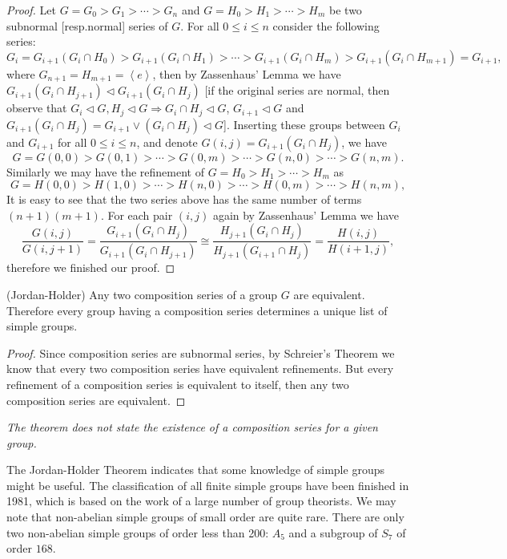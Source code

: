 \begin{proof}
Let $G=G_0>G_1>\cdots >G_n$ and $G=H_0>H_1>\cdots >H_m$ be two subnormal [resp.normal] series of $G$. For all $0\le i\le n$ consider the following series: 
$$
G_i=G_{i+1}\left( G_i\cap H_0 \right) >G_{i+1}\left( G_i\cap H_1 \right) >\cdots >G_{i+1}\left( G_i\cap H_m \right) >G_{i+1}\left( G_i\cap H_{m+1} \right) =G_{i+1},
$$
where $G_{n+1}=H_{m+1}=\left< e \right> $, then by Zassenhaus' Lemma we have $G_{i+1}\left( G_i\cap H_{j+1} \right) \lhd G_{i+1}\left( G_i\cap H_j \right) $ [if the original series are normal, then observe that $G_i\lhd G,H_j\lhd G\Rightarrow G_i\cap H_j\lhd G$, $G_{i+1}\lhd G$ and $G_{i+1}\left( G_i\cap H_j \right) =G_{i+1}\lor \left( G_i\cap H_j \right) \lhd G$]. Inserting these groups between $G_i$ and $G_{i+1}$ for all $0\le i\le n$, and denote $G\left( i,j \right) =G_{i+1}\left( G_i\cap H_j \right) $, we have 
$$
G=G\left( 0,0 \right) >G\left( 0,1 \right) >\cdots >G\left( 0,m \right) >\cdots >G\left( n,0 \right) >\cdots >G\left( n,m \right) .
$$
Similarly we may have the refinement of $G=H_0>H_1>\cdots >H_m$ as 
$$
G=H\left( 0,0 \right) >H\left( 1,0 \right) >\cdots >H\left( n,0 \right) >\cdots >H\left( 0,m \right) >\cdots >H\left( n,m \right) ,
$$
It is easy to see that the two series above has the same number of terms $(n+1)(m+1)$. For each pair $(i,j)$ again by Zassenhaus' Lemma we have 
$$
\frac{G\left( i,j \right)}{G\left( i,j+1 \right)}=\frac{G_{i+1}\left( G_i\cap H_j \right)}{G_{i+1}\left( G_i\cap H_{j+1} \right)}\cong \frac{H_{j+1}\left( G_i\cap H_j \right)}{H_{j+1}\left( G_{i+1}\cap H_j \right)}=\frac{H\left( i,j \right)}{H\left( i+1,j \right)},
$$
therefore we finished our proof.
\end{proof}
\begin{theorem}(Jordan-Holder)
Any two composition series of a group $G$ are equivalent. Therefore every group having a composition series determines a unique list of simple groups.
\end{theorem}
\begin{proof}
Since composition series are subnormal series, by Schreier's Theorem we know that every two composition series have equivalent refinements. But every refinement of a composition series is equivalent to itself, then any two composition series are equivalent.
\end{proof}
\begin{note}\em
The theorem does not state the existence of a composition series for a given group.
\end{note}
The Jordan-Holder Theorem indicates that some knowledge of simple groups might be useful. The classification of all finite simple groups have been finished in 1981, which is based on the work of a large number of group theorists. We may note that non-abelian simple groups of small order are quite rare. There are only two non-abelian simple groups of order less than 200: $A_5$ and a subgroup of $S_7$ of order $168$.
